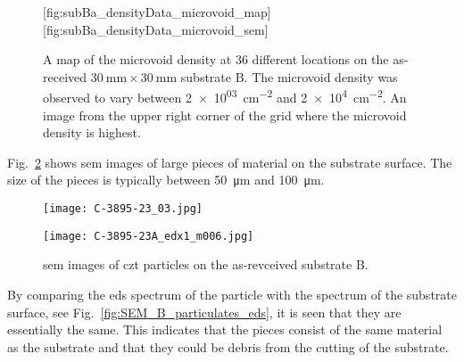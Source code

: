 \begin{figure}[htbp]
    \centering
        [fig:subBa_densityData_microvoid_map]
        \hfill
        [fig:subBa_densityData_microvoid_sem]
    \caption[Map of the microvoid density on the as-received substrate B.]{ A map of the microvoid density at 36 different locations on the as-received $\SI{30}{\milli\metre}\times\SI{30}{\milli\metre}$ substrate B. The microvoid density was observed to vary between \SI{2e+03}{\centi\metre^{-2}} and \SI{2e+4}{\centi\metre^{-2}}.  An image from the upper right corner of the grid where the microvoid density is highest.}
    \label{fig:subBa_densityData_microvoid}
\end{figure}

Fig.~\ref{fig:SEM_B_particulates} shows \ac{sem} images of large pieces of material on the substrate surface. The size of the pieces is typically between \SI{50}{\micro\metre} and \SI{100}{\micro\metre}.

\begin{figure}[htbp]
    \centering
          \begin{minipage}[t]{0.49\linewidth}
            \centering
            \texttt{[image: C-3895-23\_03.jpg]}
          \end{minipage}
          \hfill
          \begin{minipage}[t]{0.49\linewidth}
            \centering
            \texttt{[image: C-3895-23A\_edx1\_m006.jpg]}
          \end{minipage}
        \caption[\Ac{sem} images of \ac{czt} particles on as-revceived substrate B.]{\Acf{sem} images of \ac{czt} particles on the as-revceived substrate B.}\label{fig:SEM_B_particulates}  
\end{figure}

By comparing the \ac{eds} spectrum of the particle with the spectrum of the substrate surface, see Fig.~\ref{fig:SEM_B_particulates_eds}, it is seen that they are essentially the same. This indicates that the pieces consist of the same material as the substrate and that they could be debris from the cutting of the substrate.

